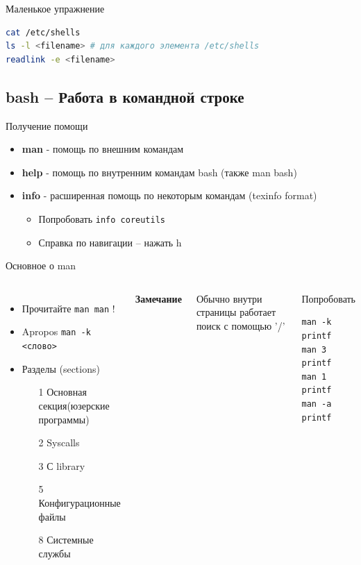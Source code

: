 \documentclass[ignorenonframetext, professionalfonts, hyperref={pdftex, unicode}]{beamer}
\begin{document}
\begin{frame}[fragile]{Маленькое упражнение}
\begin{lstlisting}[language=bash]
cat /etc/shells
ls -l <filename> # для каждого элемента /etc/shells
readlink -e <filename> 
\end{lstlisting}
\end{frame}
\subsection{bash -- Работа в командной строке}
\begin{frame}[fragile]{Получение помощи}
  \begin{itemize}
    \pause
    \item \textbf{man} - помощь по внешним командам
    \pause
    \item \textbf{help} - помощь по внутренним командам bash (также man bash)
    \pause
    \item \textbf{info} - расширенная помощь по некоторым командам (texinfo format)
      \begin{itemize}
       \item   Попробовать {\tt info coreutils}
       \item   Справка по навигации -- нажать h
      \end{itemize}
  \end{itemize}
\end{frame}
\begin{frame}[fragile]{Основное о man}
\begin{columns}
  \column{2.2in}
  \begin{itemize}
        \item Прочитайте {\tt man man} !
        \item Apropos {\tt man -k <слово>}
        \item Разделы (sections)
          \begin{itemize}
            \item[1] Основная секция(юзерские программы) 
            \item[2] Syscalls
            \item[3] С library
            \item[5] Конфигурационные файлы
            \item[8] Системные службы
          \end{itemize}
  \end{itemize}
  \textbf{Замечание}

  Обычно внутри страницы работает поиск с помощью '/'
 \pause 
 \column{1in}
 \begin{block}{Попробовать}
\begin{lstlisting}
man -k printf
man 3 printf
man 1 printf
man -a printf
\end{lstlisting}
\end{block}
\end{columns}
\end{frame}
\end{document}
